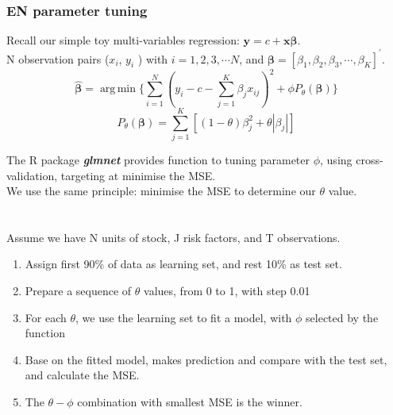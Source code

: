 \documentclass[12pt]{beamer}
\DeclareMathOperator*{\argmin}{arg\,min}
\begin{document}
	\section*{}
\begin{frame}
\frametitle{EN parameter tuning}
Recall our simple toy multi-variables regression: $\boldsymbol{y} = c +  \boldsymbol{x}{\boldsymbol{\beta}}$. \\ N observation pairs ($x_i$, $y_i$ ) with $i =1,2,3, \cdots N$, and $\boldsymbol{\beta} = [\beta_1, \beta_2, \beta_3, \cdots, \beta_K]^{\prime}$.
\[  \hat{\boldsymbol{\beta}} = \argmin \{ \sum_{i = 1}^N(y_i - c - \sum_{j=1}^{K}\beta_{j}x_{ij})^2 + \phi P_\theta(\boldsymbol{\beta})          \}  \]
\[  P_{\theta}(\boldsymbol{\beta}) = \sum_{j = 1}^{K}[(1- \theta)\beta_j^2 + \theta |\beta_j| ]          \]

The R package \textbf{\textit{glmnet}} provides function to tuning parameter $\phi$, using cross-validation, targeting at minimise the MSE.\\
We use the same principle: minimise the MSE to determine our $\theta$ value.\\
\end{frame}

	\section*{}
\begin{frame}
Assume we have N units of stock, J risk factors, and T observations.\\
\begin{enumerate}
\item Assign first 90\% of data as learning set, and rest 10\% as test set.
\item Prepare a sequence of $\theta$ values, from 0 to 1, with step 0.01
\item For each $\theta$, we use the learning set to fit a model, with $\phi$ selected by the function
\item Base on the fitted model, makes prediction and compare with the test set, and calculate the MSE.
\item The $\theta-\phi$ combination with smallest MSE is the winner.
\end{enumerate}
\end{frame}
\end{document}

